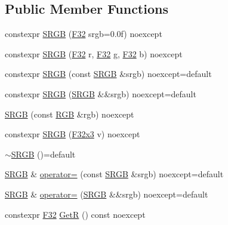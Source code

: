 \subsection*{Public Member Functions}
\begin{DoxyCompactItemize}
\item 
constexpr \mbox{\hyperlink{structmage_1_1_s_r_g_b_a5f1cc4d90aaa3801f1146eb767d45476}{S\+R\+GB}} (\mbox{\hyperlink{namespacemage_aa97e833b45f06d60a0a9c4fc22ae02c0}{F32}} srgb=0.\+0f) noexcept
\item 
constexpr \mbox{\hyperlink{structmage_1_1_s_r_g_b_acf4eb424d13f8ee60065c3d7e118987b}{S\+R\+GB}} (\mbox{\hyperlink{namespacemage_aa97e833b45f06d60a0a9c4fc22ae02c0}{F32}} r, \mbox{\hyperlink{namespacemage_aa97e833b45f06d60a0a9c4fc22ae02c0}{F32}} g, \mbox{\hyperlink{namespacemage_aa97e833b45f06d60a0a9c4fc22ae02c0}{F32}} b) noexcept
\item 
constexpr \mbox{\hyperlink{structmage_1_1_s_r_g_b_a3b895db44e4e6cc72249fadc093cf084}{S\+R\+GB}} (const \mbox{\hyperlink{structmage_1_1_s_r_g_b}{S\+R\+GB}} \&srgb) noexcept=default
\item 
constexpr \mbox{\hyperlink{structmage_1_1_s_r_g_b_aca835f4281827524ad14345ddb28208a}{S\+R\+GB}} (\mbox{\hyperlink{structmage_1_1_s_r_g_b}{S\+R\+GB}} \&\&srgb) noexcept=default
\item 
\mbox{\hyperlink{structmage_1_1_s_r_g_b_a4b56eeabfaee47d0f0685a061947ce59}{S\+R\+GB}} (const \mbox{\hyperlink{structmage_1_1_r_g_b}{R\+GB}} \&rgb) noexcept
\item 
constexpr \mbox{\hyperlink{structmage_1_1_s_r_g_b_abb02103839b539049a6dd54dd7936b16}{S\+R\+GB}} (\mbox{\hyperlink{namespacemage_a1e3c7a882af461f161caa1cbddaf1fa2}{F32x3}} v) noexcept
\item 
\mbox{\hyperlink{structmage_1_1_s_r_g_b_aa5bb0738c6026da6c3e4f54869c52cbc}{$\sim$\+S\+R\+GB}} ()=default
\item 
\mbox{\hyperlink{structmage_1_1_s_r_g_b}{S\+R\+GB}} \& \mbox{\hyperlink{structmage_1_1_s_r_g_b_a08c0aaef872868f2415b5d58c5611764}{operator=}} (const \mbox{\hyperlink{structmage_1_1_s_r_g_b}{S\+R\+GB}} \&srgb) noexcept=default
\item 
\mbox{\hyperlink{structmage_1_1_s_r_g_b}{S\+R\+GB}} \& \mbox{\hyperlink{structmage_1_1_s_r_g_b_a73ee0aadb04bbf07976b1e2daded2aff}{operator=}} (\mbox{\hyperlink{structmage_1_1_s_r_g_b}{S\+R\+GB}} \&\&srgb) noexcept=default
\item 
constexpr \mbox{\hyperlink{namespacemage_aa97e833b45f06d60a0a9c4fc22ae02c0}{F32}} \mbox{\hyperlink{structmage_1_1_s_r_g_b_a0089fdce78dc4da495323f0f6a162546}{GetR}} () const noexcept

\end{DoxyCompactItemize}

